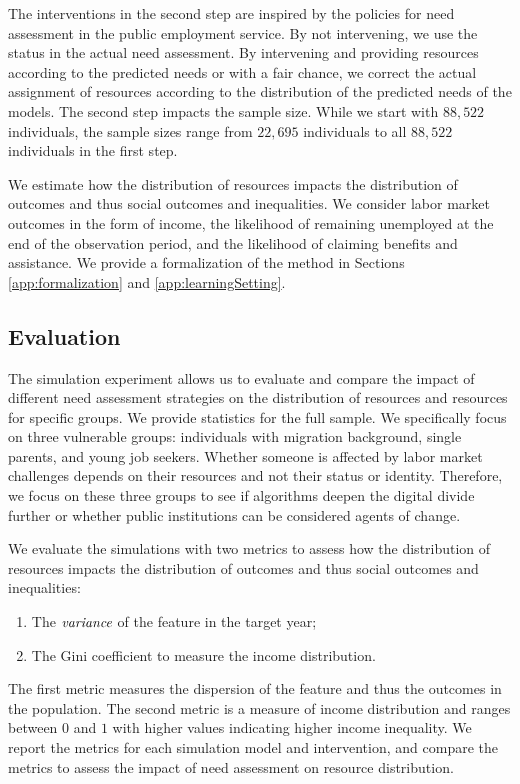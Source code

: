 The interventions in the second step are inspired by the policies for need assessment in the public employment service. By not intervening, we use the status in the actual need assessment. By intervening and providing resources according to the predicted needs or with a fair chance, we correct the actual assignment of resources according to the distribution of the predicted needs of the models.
The second step impacts the sample size. While we start with $88{,}522$ individuals, the sample sizes range from $22{,}695$ individuals to all $88{,}522$ individuals in the first step.

We estimate how the distribution of resources impacts the distribution of outcomes and thus social outcomes and inequalities. We consider labor market outcomes in the form of income, the likelihood of remaining unemployed at the end of the observation period, and the likelihood of claiming benefits and assistance.
We provide a formalization of the method in Sections \ref{app:formalization} and \ref{app:learningSetting}.

\subsection{Evaluation}
\label{sec:eval}
The simulation experiment allows us to evaluate and compare the impact of different need assessment strategies on the distribution of resources and resources for specific groups. We provide statistics for the full sample. We specifically focus on three vulnerable groups: individuals with migration background, single parents, and young job seekers. Whether someone is affected by labor market challenges depends on their resources and not their status or identity. Therefore, we focus on these three groups to see if algorithms deepen the digital divide further or whether public institutions can be considered agents of change.

We evaluate the simulations with two metrics to assess how the distribution of resources impacts the distribution of outcomes and thus social outcomes and inequalities:
\begin{enumerate}
\item[(i)] The $\emph{variance}$ of the feature in the target year;
\item[(ii)] The Gini coefficient to measure the income distribution.
\end{enumerate}
The first metric measures the dispersion of the feature and thus the outcomes in the population. The second metric is a measure of income distribution and ranges between $0$ and $1$ with higher values indicating higher income inequality. We report the metrics for each simulation model and intervention, and compare the metrics to assess the impact of need assessment on resource distribution.





